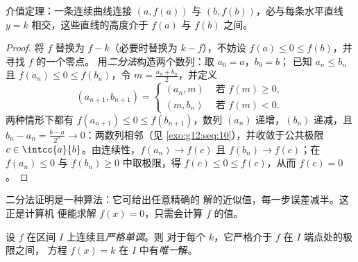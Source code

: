 \begin{omfigure}

{\small 介值定理：一条连续曲线连接
$(a, f(a))$ 与 $(b, f(b))$，必与每条水平直线
$y = k$ 相交，这些直线的高度介于 $f(a)$ 与 $f(b)$ 之间。}
\end{omfigure}

\begin{proof}
将 $f$ 替换为 $f - k$（必要时替换为 $k - f$），不妨设
$f(a) \leq 0 \leq f(b)$，并寻找 $f$ 的一个零点。
用\emph{二分法}构造两个数列：取 $a_0 = a$，$b_0 = b$；
已知 $a_n \leq b_n$ 且 $f(a_n) \leq 0 \leq f(b_n)$，令
$m = \frac{a_n + b_n}{2}$，并定义
\[
(a_{n+1}, b_{n+1}) =
\begin{cases}
(a_n, m) & \text{ 若 } f(m) \geq 0,\\
(m, b_n) & \text{ 若 } f(m) < 0.
\end{cases}
\]
两种情形下都有 $f(a_{n+1}) \leq 0 \leq f(b_{n+1})$，数列 $(a_n)$
递增，$(b_n)$ 递减，且
$b_n - a_n = \frac{b-a}{2^n} \to 0$：两数列相邻（见
\cref{exo:g12:seq:10}），并收敛于公共极限
$c \in \intcc{a}{b}$。由连续性，$f(a_n) \to f(c)$ 且
$f(b_n) \to f(c)$；在 $f(a_n) \leq 0$ 与
$f(b_n) \geq 0$ 中取极限，得 $f(c) \leq 0 \leq f(c)$，从而 $f(c) = 0$。
\end{proof}

\begin{remark}
二分法证明是一种算法：它可给出任意精确的
解的近似值，每一步误差减半。这正是计算机
便能求解 $f(x) = 0$，只需会计算 $f$ 的值。
\end{remark}

\begin{theorem}[双射定理]\label{thm:g12:limcont:bijection}
设 $f$ 在区间 $I$ 上连续且\emph{严格单调}。则
对于每个 $k$，它严格介于 $f$ 在 $I$ 端点处的极限之间，
方程 $f(x) = k$ 在 $I$ 中有\emph{唯一}解。
\end{theorem}

